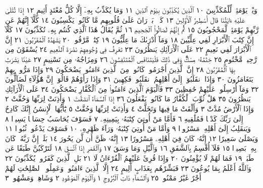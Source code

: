 وَيْلࣱ يَوْمَئِذࣲ لِّلْمُكَذِّبِينَ ١٠ ٱلَّذِينَ يُكَذِّبُونَ بِيَوْمِ ٱلدِّينِ ١١ وَمَا يُكَذِّبُ
بِهِۦٓ إِلَّا كُلُّ مُعْتَدٍ أَثِيمٍ ١٢ إِذَا تُتْلَىٰ عَلَيْهِ ءَايَٰتُنَا قَالَ أَسَٰطِيرُ ٱلْأَوَّلِينَ ١٣
كَلَّاۖ بَلْ͏ۜ رَانَ عَلَىٰ قُلُوبِهِم مَّا كَانُوا۟ يَكْسِبُونَ ١٤ كَلَّآ إِنَّهُمْ عَن رَّبِّهِمْ
يَوْمَئِذࣲ لَّمَحْجُوبُونَ ١٥ ثُمَّ إِنَّهُمْ لَصَالُوا۟ ٱلْجَحِيمِ ١٦ ثُمَّ يُقَالُ هَٰذَا
ٱلَّذِي كُنتُم بِهِۦ تُكَذِّبُونَ ١٧ كَلَّآ إِنَّ كِتَٰبَ ٱلْأَبْرَارِ لَفِي عِلِّيِّينَ ١٨
وَمَآ أَدْرَىٰكَ مَا عِلِّيُّونَ ١٩ كِتَٰبࣱ مَّرْقُومࣱ ٢٠ يَشْهَدُهُ ٱلْمُقَرَّبُونَ ٢١
إِنَّ ٱلْأَبْرَارَ لَفِي نَعِيمٍ ٢٢ عَلَى ٱلْأَرَآئِكِ يَنظُرُونَ ٢٣ تَعْرِفُ فِي
وُجُوهِهِمْ نَضْرَةَ ٱلنَّعِيمِ ٢٤ يُسْقَوْنَ مِن رَّحِيقࣲ مَّخْتُومٍ ٢٥ خِتَٰمُهُۥ
مِسْكࣱۚ وَفِي ذَٰلِكَ فَلْيَتَنَافَسِ ٱلْمُتَنَٰفِسُونَ ٢٦ وَمِزَاجُهُۥ مِن
تَسْنِيمٍ ٢٧ عَيْنࣰا يَشْرَبُ بِهَا ٱلْمُقَرَّبُونَ ٢٨ إِنَّ ٱلَّذِينَ أَجْرَمُوا۟ كَانُوا۟
مِنَ ٱلَّذِينَ ءَامَنُوا۟ يَضْحَكُونَ ٢٩ وَإِذَا مَرُّوا۟ بِهِمْ يَتَغَامَزُونَ ٣٠
وَإِذَا ٱنقَلَبُوٓا۟ إِلَىٰٓ أَهْلِهِمُ ٱنقَلَبُوا۟ فَكِهِينَ ٣١ وَإِذَا رَأَوْهُمْ قَالُوٓا۟
إِنَّ هَٰٓؤُلَآءِ لَضَآلُّونَ ٣٢ وَمَآ أُرْسِلُوا۟ عَلَيْهِمْ حَٰفِظِينَ ٣٣
فَٱلْيَوْمَ ٱلَّذِينَ ءَامَنُوا۟ مِنَ ٱلْكُفَّارِ يَضْحَكُونَ ٣٤ عَلَى
ٱلْأَرَآئِكِ يَنظُرُونَ ٣٥ هَلْ ثُوِّبَ ٱلْكُفَّارُ مَا كَانُوا۟ يَفْعَلُونَ ٣٦
إِذَا ٱلسَّمَآءُ ٱنشَقَّتْ ١ وَأَذِنَتْ لِرَبِّهَا وَحُقَّتْ ٢ وَإِذَا ٱلْأَرْضُ مُدَّتْ ٣
وَأَلْقَتْ مَا فِيهَا وَتَخَلَّتْ ٤ وَأَذِنَتْ لِرَبِّهَا وَحُقَّتْ ٥ يَٰٓأَيُّهَا
ٱلْإِنسَٰنُ إِنَّكَ كَادِحٌ إِلَىٰ رَبِّكَ كَدْحࣰا فَمُلَٰقِيهِ ٦ فَأَمَّا مَنْ أُوتِيَ
كِتَٰبَهُۥ بِيَمِينِهِۦ ٧ فَسَوْفَ يُحَاسَبُ حِسَابࣰا يَسِيرࣰا ٨ وَيَنقَلِبُ
إِلَىٰٓ أَهْلِهِۦ مَسْرُورࣰا ٩ وَأَمَّا مَنْ أُوتِيَ كِتَٰبَهُۥ وَرَآءَ ظَهْرِهِۦ ١٠ فَسَوْفَ
يَدْعُوا۟ ثُبُورࣰا ١١ وَيَصْلَىٰ سَعِيرًا ١٢ إِنَّهُۥ كَانَ فِيٓ أَهْلِهِۦ مَسْرُورًا ١٣
إِنَّهُۥ ظَنَّ أَن لَّن يَحُورَ ١٤ بَلَىٰٓۚ إِنَّ رَبَّهُۥ كَانَ بِهِۦ بَصِيرࣰا ١٥ فَلَآ أُقْسِمُ
بِٱلشَّفَقِ ١٦ وَٱلَّيْلِ وَمَا وَسَقَ ١٧ وَٱلْقَمَرِ إِذَا ٱتَّسَقَ ١٨
لَتَرْكَبُنَّ طَبَقًا عَن طَبَقࣲ ١٩ فَمَا لَهُمْ لَا يُؤْمِنُونَ ٢٠ وَإِذَا قُرِئَ
عَلَيْهِمُ ٱلْقُرْءَانُ لَا  ٢١ بَلِ ٱلَّذِينَ كَفَرُوا۟ يُكَذِّبُونَ ٢٢
وَٱللَّهُ أَعْلَمُ بِمَا يُوعُونَ ٢٣ فَبَشِّرْهُم بِعَذَابٍ أَلِيمٍ ٢٤
إِلَّا ٱلَّذِينَ ءَامَنُوا۟ وَعَمِلُوا۟ ٱلصَّٰلِحَٰتِ لَهُمْ أَجْرٌ غَيْرُ مَمْنُونِۭ ٢٥
وَٱلسَّمَآءِ ذَاتِ ٱلْبُرُوجِ ١ وَٱلْيَوْمِ ٱلْمَوْعُودِ ٢ وَشَاهِدࣲ وَمَشْهُودࣲ ٣
